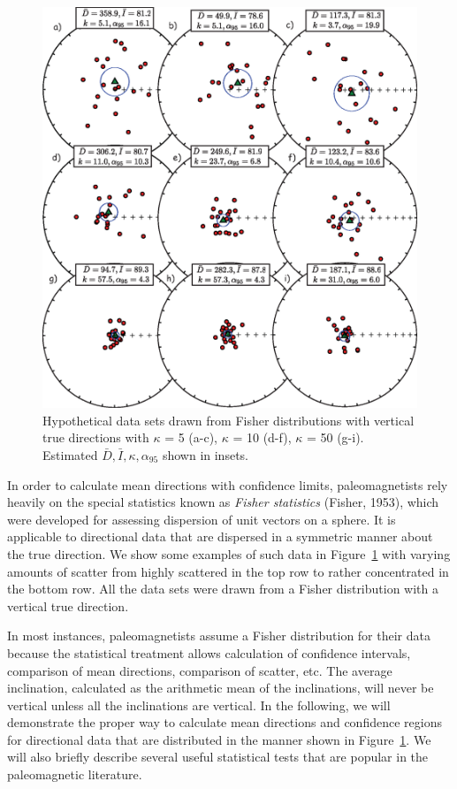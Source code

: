 \begin{figure}[h!tb]
\centering  \includegraphics[width= 12 cm]{EPSfiles/fisher.eps}
\caption {Hypothetical data sets drawn from Fisher distributions with vertical true directions with $\kappa $ = 5  (a-c), $\kappa $ = 10 (d-f),  $\kappa$ = 50 (g-i).  Estimated $\bar D, \bar I, \kappa, \alpha_{95}$ shown in insets.  
}
\label{fig:fisher}
\end{figure}


In order to calculate mean directions with confidence limits, paleomagnetists
rely heavily on the special statistics 
known as 
{\it Fisher statistics}
(Fisher, 1953), \nocite{fisher53}
which were developed for assessing dispersion of unit vectors on a sphere. It is applicable to directional data that are dispersed in a symmetric manner about the true direction.  We show some examples of such data in Figure~\ref{fig:fisher} with varying amounts of scatter from highly scattered in the top row to rather concentrated in the bottom row.  All the data sets were drawn from a Fisher distribution with a  vertical true direction.  

  In most instances, paleomagnetists assume a
Fisher distribution for their data because the statistical treatment allows
calculation of confidence intervals, comparison of mean directions,
 comparison of scatter, etc.
 The average inclination, calculated as the arithmetic mean of the inclinations,
will  never be vertical unless all the inclinations are vertical.  
In the following, we will demonstrate the proper way to
calculate mean directions and confidence regions for directional data
that are distributed in the manner shown in Figure~\ref{fig:fisher}.  We
will also briefly describe several useful statistical tests that are popular in the
paleomagnetic literature.     

